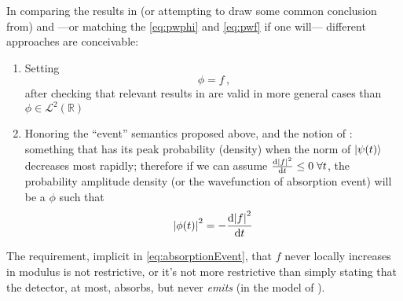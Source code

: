 In comparing the results in (or attempting to draw some common conclusion from)
\cite{Lloyd:Time} and \cite{RuschhauptAbsorption}
---or matching the \eqref{eq:pwphi} and \eqref{eq:pwf} if one will---
different approaches are conceivable:
\begin{enumerate}
  \item
    Setting
    \begin{equation}
      \phi = f \, \text{,}
    \end{equation}
    after checking that relevant results in \cite{Lloyd:Time} are valid in more general cases than
    $\phi \in \mathcal{L}^2(\mathbb{R})$
  \item
    Honoring the ``event'' semantics proposed above, and the notion of :
    something that has its peak probability (density)
    when the norm of $\ket{\psi(t)}$ decreases most rapidly; therefore if we can assume
    $\dv{\abs{f}^2}{t} \leq 0 \; \forall t$, the probability amplitude density
    (or the wavefunction of absorption event) will be a $\phi$ such that
    \begin{equation}\label{eq:absorptionEvent}
      \abs{\phi(t)}^2 = -\dv{\abs{f}^2}{t}
    \end{equation} 
\end{enumerate}

The requirement, implicit  in \eqref{eq:absorptionEvent},
that $f$ never locally increases in modulus
is not restrictive, or it's not more restrictive than simply stating
that the detector, at most, absorbs, but never \emph{emits}
(in the model of \cite{RuschhauptAbsorption}).

